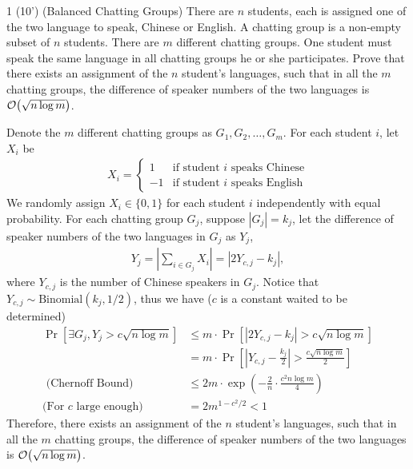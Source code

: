 \begin{question}{1 (10') (Balanced Chatting Groups)}
   There are $n$ students, each is assigned one of the two language to speak, Chinese or English. A chatting group is a non-empty subset of $n$ students. There are $m$ different chatting groups. One student must speak the same language in all chatting groups he or she participates. Prove that there exists an assignment of the $n$ student's languages, such that in all the $m$ chatting groups, the difference of speaker numbers of the two languages is $\order{\sqrt{n \log{m}}}$.    
\end{question} 


\begin{answer}
   Denote the $m$ different chatting groups as $G_1, G_2, \ldots, G_m$. For each student $i$, let $X_i$ be
   \begin{align*}
         X_i = \begin{cases}
            1 & \text{if student $i$ speaks Chinese} \\
            -1 & \text{if student $i$ speaks English}
         \end{cases}
   \end{align*}   
   We randomly assign $X_i \in \{0,1\}$ for each student $i$ independently with equal probability. 
   For each chatting group $G_j$, suppose $|G_j| = k_j$, let the difference of speaker numbers of the two languages in $G_j$ as $Y_j$, 
   \begin{align*}
      Y_j = \left|\sum_{i \in G_j} X_i\right|  = |2 Y_{c,j} - k_j|, 
   \end{align*} 
   where $Y_{c,j}$ is the number of Chinese speakers in $G_j$. Notice that $Y_{c,j} \sim \text{Binomial}(k_j, 1/2)$, 
   thus we have ($c$ is a constant waited to be determined)
   \begin{align*}
      \Pr\left[\exists G_j, Y_j > c \sqrt{n\log m}\right] &\le m \cdot \Pr\left[ |2 Y_{c,j} - k_j| > c \sqrt{n\log m} \right] \\
      &= m \cdot \Pr\left[ \left|Y_{c,j} -\frac{k_j}{2}\right| > \frac{c \sqrt{n\log m}}{2} \right] \\
     \text{ (Chernoff Bound) } &\le 2 m \cdot \exp\left(-\frac{2}{n} \cdot \frac{c^2 n \log m}{4}\right) \\
      \text{(For $c$ large enough) } &= 2 m^{1 - c^2/2} < 1 
   \end{align*}
   Therefore, there exists an assignment of the $n$ student's languages, such that in all the $m$ chatting groups, the difference of speaker numbers of the two languages is $\order{\sqrt{n \log{m}}}$. \ed
\end{answer}